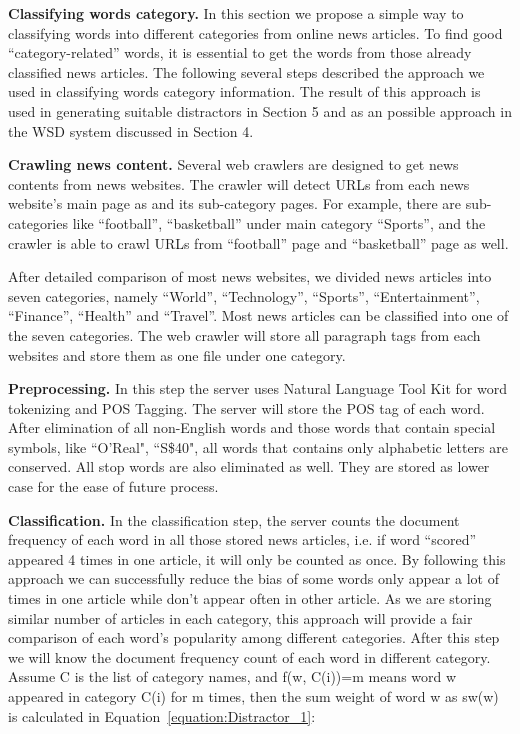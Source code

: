 {\bf Classifying words category.}
In this section we propose a simple way to classifying words into different categories from online news articles. To find good “category-related” words, it is essential to get the words from those already classified news articles. The following several steps described the approach we used in classifying words category information. The result of this approach is used in generating suitable distractors in Section 5 and as an possible approach in the WSD system discussed in Section 4. 

{\bf Crawling news content.}
Several web crawlers are designed to get news contents from news websites. The crawler will detect URLs from each news website’s main page as and its sub-category pages. For example, there are sub-categories like “football”, “basketball” under main category “Sports”, and the crawler is able to crawl URLs from “football” page and “basketball” page as well. 

After detailed comparison of most news websites, we divided news articles into seven categories, namely “World”, “Technology”, “Sports”, “Entertainment”, “Finance”, “Health” and “Travel”. Most news articles can be classified into one of the seven categories. The web crawler will store all paragraph tags from each websites and store them as one file under one category. 

{\bf Preprocessing.}
In this step the server uses Natural Language Tool Kit \cite{edw09} for word tokenizing and POS Tagging. The server will store the POS tag of each word. After elimination of all non-English words and those words that contain special symbols, like ``O’Real", ``S\$40", all words that contains only alphabetic letters are conserved. All stop words are also eliminated as well. They are stored as lower case for the ease of future process.

{\bf Classification.}
In the classification step, the server counts the document frequency of each word in all those stored news articles, i.e. if word “scored” appeared 4 times in one article, it will only be counted as once. By following this approach we can successfully reduce the bias of some words only appear a lot of times in one article while don’t appear often in other article. As we are storing similar number of articles in each category, this approach will provide a fair comparison of each word’s popularity among different categories. After this step we will know the document frequency count of each word in different category. 
Assume C is the list of category names, and f(w, C(i))=m means word w appeared in category C(i) for m times, then the sum weight of word w as sw(w) is calculated in Equation~\ref{equation:Distractor_1}:

